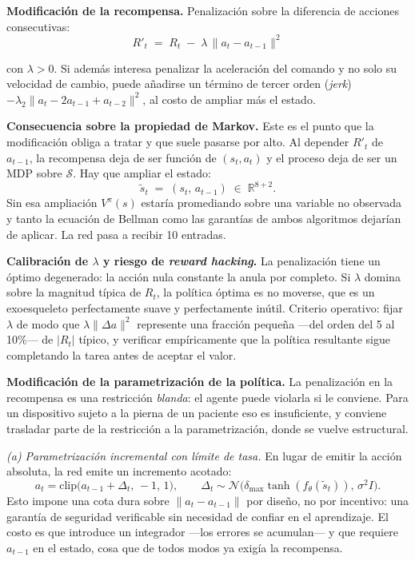 \documentclass[11pt,letterpaper]{article}
\newcommand{\lead}[1]{\textbf{#1}}
\begin{document}
\begin{respuesta}
\lead{Modificación de la recompensa.} Penalización sobre la diferencia de acciones
consecutivas:
\[
  R'_t \;=\; R_t \;-\; \lambda \,\lVert a_t - a_{t-1} \rVert^{2}
\]

con $\lambda > 0$. Si además interesa penalizar la aceleración del comando y no solo su
velocidad de cambio, puede añadirse un término de tercer orden (\textit{jerk})
$-\lambda_2\lVert a_t - 2a_{t-1} + a_{t-2}\rVert^2$, al costo de ampliar más el estado.

\medskip
\lead{Consecuencia sobre la propiedad de Markov.} Este es el punto que la modificación
obliga a tratar y que suele pasarse por alto. Al depender $R'_t$ de $a_{t-1}$, la
recompensa deja de ser función de $(s_t,a_t)$ y el proceso deja de ser un MDP sobre
$\mathcal{S}$. Hay que ampliar el estado:
\[
  \tilde{s}_t \;=\; (s_t,\, a_{t-1}) \;\in\; \mathbb{R}^{8+2}.
\]
Sin esa ampliación $V^\pi(s)$ estaría promediando sobre una variable no observada y tanto
la ecuación de Bellman como las garantías de ambos algoritmos dejarían de aplicar. La
red pasa a recibir 10 entradas.

\medskip
\lead{Calibración de $\lambda$ y riesgo de \textit{reward hacking}.} La penalización tiene
un óptimo degenerado: la acción nula constante la anula por completo. Si $\lambda$ domina
sobre la magnitud típica de $R_t$, la política óptima es no moverse, que es un
exoesqueleto perfectamente suave y perfectamente inútil. Criterio operativo: fijar
$\lambda$ de modo que $\lambda\lVert\Delta a\rVert^2$ represente una fracción pequeña
—del orden del 5 al 10\%— de $|R_t|$ típico, y verificar empíricamente que la política
resultante sigue completando la tarea antes de aceptar el valor.

\medskip
\lead{Modificación de la parametrización de la política.} La penalización en la recompensa
es una restricción \emph{blanda}: el agente puede violarla si le conviene. Para un
dispositivo sujeto a la pierna de un paciente eso es insuficiente, y conviene trasladar
parte de la restricción a la parametrización, donde se vuelve estructural.

\emph{(a) Parametrización incremental con límite de tasa.} En lugar de emitir la acción
absoluta, la red emite un incremento acotado:
\[
  a_t = \mathrm{clip}\big(a_{t-1} + \Delta_t,\,-1,\,1\big),
  \qquad \Delta_t \sim \mathcal{N}\big(\delta_{\max}\tanh(f_\theta(\tilde{s}_t)),\,\sigma^2 I\big).
\]
Esto impone una cota dura sobre $\lVert a_t - a_{t-1}\rVert$ por diseño, no por
incentivo: una garantía de seguridad verificable sin necesidad de confiar en el
aprendizaje. El costo es que introduce un integrador —los errores se acumulan— y que
requiere $a_{t-1}$ en el estado, cosa que de todos modos ya exigía la recompensa.


\end{respuesta}
\end{document}
